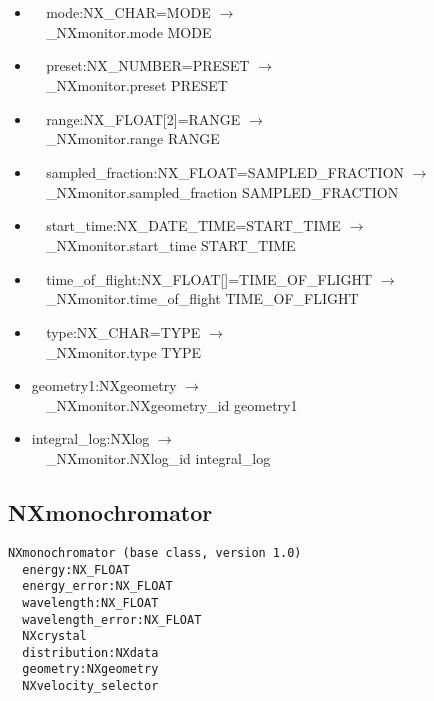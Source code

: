 \documentclass[11pt]{article}
\begin{document}
{{\begin{itemize}
\item{\verb|  |mode:NX\_CHAR=MODE $\rightarrow$\\
\verb|  |\_NXmonitor.mode MODE}

\item{\verb|  |preset:NX\_NUMBER=PRESET $\rightarrow$\\
\verb|  |\_NXmonitor.preset PRESET}

\item{\verb|  |range:NX\_FLOAT[2]=RANGE $\rightarrow$\\
\verb|  |\_NXmonitor.range RANGE}

\item{\verb|  |sampled\_fraction:NX\_FLOAT=SAMPLED\_FRACTION $\rightarrow$\\
\verb|  |\_NXmonitor.sampled\_fraction SAMPLED\_FRACTION}

\item{\verb|  |start\_time:NX\_DATE\_TIME=START\_TIME $\rightarrow$\\
\verb|  |\_NXmonitor.start\_time START\_TIME}

\item{\verb|  |time\_of\_flight:NX\_FLOAT[]=TIME\_OF\_FLIGHT $\rightarrow$\\
\verb|  |\_NXmonitor.time\_of\_flight TIME\_OF\_FLIGHT}

\item{\verb|  |type:NX\_CHAR=TYPE $\rightarrow$\\
\verb|  |\_NXmonitor.type TYPE}

\item{geometry1:NXgeometry $\rightarrow$\\
\verb|  |\_NXmonitor.NXgeometry\_id geometry1}

\item{integral\_log:NXlog $\rightarrow$\\
\verb|  |\_NXmonitor.NXlog\_id integral\_log}
\end{itemize}
\subsection{NXmonochromator}

\begin{verbatim}
NXmonochromator (base class, version 1.0)
  energy:NX_FLOAT
  energy_error:NX_FLOAT
  wavelength:NX_FLOAT
  wavelength_error:NX_FLOAT
  NXcrystal
  distribution:NXdata
  geometry:NXgeometry
  NXvelocity_selector
\end{verbatim}

}}
\end{document}
